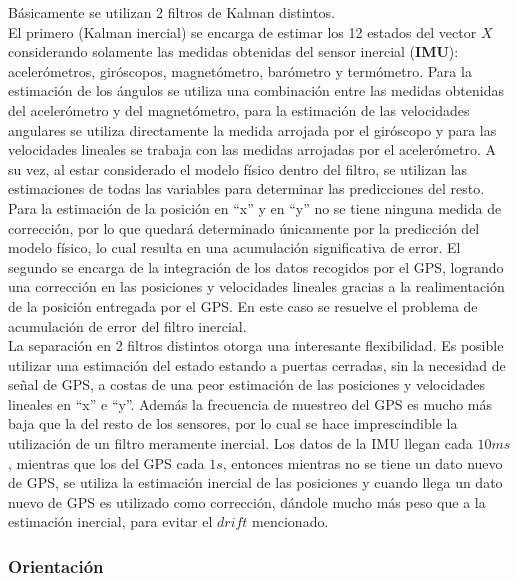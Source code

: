\documentclass[main]{subfiles}
\begin{document}
Básicamente se utilizan 2 filtros de Kalman distintos.\\
El primero (Kalman inercial) se encarga de estimar los 12 estados del vector $X$ considerando solamente las medidas obtenidas del sensor inercial (\textbf{IMU}): acelerómetros, giróscopos, magnetómetro, barómetro y termómetro. Para la estimación de los ángulos se utiliza una combinación entre las medidas obtenidas del acelerómetro y del magnetómetro, para la estimación de las velocidades angulares se utiliza directamente la medida arrojada por el giróscopo y para las velocidades lineales se trabaja con las medidas arrojadas por el acelerómetro. A su vez, al estar considerado el modelo físico dentro del filtro, se utilizan las estimaciones de todas las variables para determinar las predicciones del resto. Para la estimación de la posición en ``x'' y en ``y'' no se tiene ninguna medida de corrección, por lo que quedará determinado únicamente por la predicción del modelo físico, lo cual resulta en una acumulación significativa de error.
El segundo se encarga de la integración de los datos recogidos por el GPS, logrando una corrección en las posiciones y velocidades lineales gracias a la realimentación de la posición entregada por el GPS. En este caso se resuelve el problema de acumulación de error del filtro inercial.\\

La separación en 2 filtros distintos otorga una interesante flexibilidad. Es posible utilizar una estimación del estado estando a puertas cerradas, sin la necesidad de señal de GPS, a costas de una peor estimación de las posiciones y velocidades lineales en ``x'' e ``y''. Además la frecuencia de muestreo del GPS es mucho más baja que la del resto de los sensores, por lo cual se hace imprescindible la utilización de un filtro meramente inercial. Los datos de la IMU llegan cada $10ms$, mientras que los del GPS cada $1s$, entonces mientras no se tiene un dato nuevo de GPS, se utiliza la estimación inercial de las posiciones y cuando llega un dato nuevo de GPS es utilizado como corrección, dándole mucho más peso que a la estimación inercial, para evitar el $drift$ mencionado.

\subsubsection*{Orientación}
\end{document}

